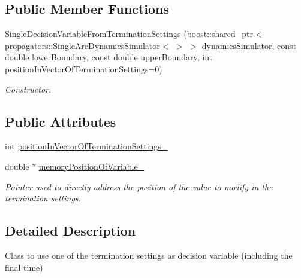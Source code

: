 \subsection*{Public Member Functions}
\begin{DoxyCompactItemize}
\item 
\hyperlink{structtudat_1_1optimization_1_1SingleDecisionVariableFromTerminationSettings_a1ded5ca8d8b2b328d35ca6eea282fdc9}{Single\+Decision\+Variable\+From\+Termination\+Settings} (boost\+::shared\+\_\+ptr$<$ \hyperlink{classtudat_1_1propagators_1_1SingleArcDynamicsSimulator}{propagators\+::\+Single\+Arc\+Dynamics\+Simulator}$<$  $>$ $>$ dynamics\+Simulator, const double lower\+Boundary, const double upper\+Boundary, int position\+In\+Vector\+Of\+Termination\+Settings=0)
\begin{DoxyCompactList}\small\item\em Constructor. \end{DoxyCompactList}\end{DoxyCompactItemize}
\subsection*{Public Attributes}
\begin{DoxyCompactItemize}
\item 
int \hyperlink{structtudat_1_1optimization_1_1SingleDecisionVariableFromTerminationSettings_abb208991fa98dc0c0a385c977f9b80a2}{position\+In\+Vector\+Of\+Termination\+Settings\+\_\+}
\item 
double $\ast$ \hyperlink{structtudat_1_1optimization_1_1SingleDecisionVariableFromTerminationSettings_a5edfa7f20b85e7e02e18f15aea15816a}{memory\+Position\+Of\+Variable\+\_\+}\hypertarget{structtudat_1_1optimization_1_1SingleDecisionVariableFromTerminationSettings_a5edfa7f20b85e7e02e18f15aea15816a}{}\label{structtudat_1_1optimization_1_1SingleDecisionVariableFromTerminationSettings_a5edfa7f20b85e7e02e18f15aea15816a}

\begin{DoxyCompactList}\small\item\em Pointer used to directly address the position of the value to modify in the termination settings. \end{DoxyCompactList}\end{DoxyCompactItemize}


\subsection{Detailed Description}
Class to use one of the termination settings as decision variable (including the final time) 

